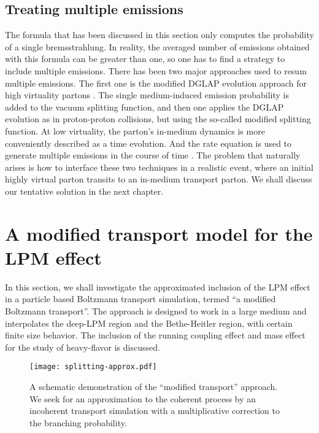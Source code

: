 \subsection{Treating multiple emissions}
The formula that has been discussed in this section only computes the probability of a single bremsstrahlung.
In reality, the averaged number of emissions obtained with this formula can be greater than one, so one has to find a strategy to include multiple emissions.
There has been two major approaches used to resum multiple emissions.
The first one is the modified DGLAP evolution approach for high virtuality partons \cite{Wang:2002pk,Cao:2017qpx}.
The single medium-induced emission probability is added to the vacuum splitting function, and then one applies the DGLAP evolution as in proton-proton collisions, but using the so-called modified splitting function.
At low virtuality, the parton's in-medium dynamics is more conveniently described as a time evolution. 
And the rate equation is used to generate multiple emissions in the course of time \cite{Arnold:2002zm,Jeon:2003gi,Schenke:2009gb}.
The problem that naturally arises is how to interface these two techniques in a realistic event, where an initial highly virtual parton transits to an in-medium transport parton.
We shall discuss our tentative solution in the next chapter.


\section{A modified transport model for the LPM effect}
\label{section:modified-transport}
In this section, we shall investigate the approximated inclusion of the LPM effect in a particle based Boltzmann transport simulation, termed ``a modified Boltzmann transport''.
The approach is designed to work in a large medium and interpolates the deep-LPM region and the Bethe-Heitler region, with certain finite size behavior.
The inclusion of the running coupling effect and mass effect for the study of heavy-flavor is discussed.

\begin{figure}
\singlespacing
\centering
\texttt{[image: splitting-approx.pdf]}
\caption[A schematic demonstration of the ``modified transport'' approach.]{A schematic demonstration of the ``modified transport'' approach. We seek for an approximation to the coherent process by an incoherent transport simulation with a multiplicative correction to the branching probability.}
\label{fig:split-approx}
\end{figure}
